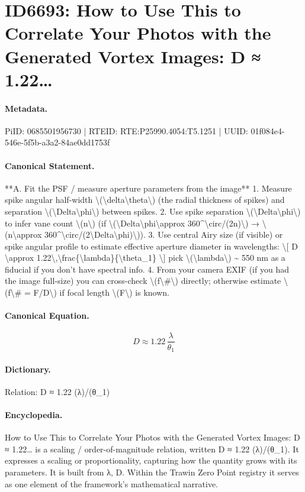 \section*{ID6693: How to Use This to Correlate Your Photos with the Generated Vortex Images: D ≈ 1.22…}
\paragraph{Metadata.}
PiID: 0685501956730 | RTEID: RTE:P25990.4054:T5.1251 | UUID: 01f084e4-546e-5f5b-a3a2-84ae0dd1753f

\paragraph{Canonical Statement.}
**A. Fit the PSF / measure aperture parameters from the image** 1. Measure spike angular half-width \textbackslash{}(\textbackslash{}delta\textbackslash{}theta\textbackslash{}) (the radial thickness of spikes) and separation \textbackslash{}(\textbackslash{}Delta\textbackslash{}phi\textbackslash{}) between spikes. 2. Use spike separation \textbackslash{}(\textbackslash{}Delta\textbackslash{}phi\textbackslash{}) to infer vane count \textbackslash{}(n\textbackslash{}) (if \textbackslash{}(\textbackslash{}Delta\textbackslash{}phi\textbackslash{}approx 360\textasciicircum{}\textbackslash{}circ/(2n)\textbackslash{}) → \textbackslash{}(n\textbackslash{}approx 360\textasciicircum{}\textbackslash{}circ/(2\textbackslash{}Delta\textbackslash{}phi)\textbackslash{})). 3. Use central Airy size (if visible) or spike angular profile to estimate effective aperture diameter in wavelengths: \textbackslash{}[ D \textbackslash{}approx 1.22\textbackslash{},\textbackslash{}frac\{\textbackslash{}lambda\}\{\textbackslash{}theta\_1\} \textbackslash{}] pick \textbackslash{}(\textbackslash{}lambda\textbackslash{}) \textasciitilde{} 550 nm as a fiducial if you don’t have spectral info. 4. From your camera EXIF (if you had the image full-size) you can cross-check \textbackslash{}(f\textbackslash{}\#\textbackslash{}) directly; otherwise estimate \textbackslash{}(f\textbackslash{}\# = F/D\textbackslash{}) if focal length \textbackslash{}(F\textbackslash{}) is known.

\paragraph{Canonical Equation.}
\[
D \approx 1.22\,\frac{\lambda}{\theta_1}
\]

\paragraph{Dictionary.}
Relation: D ≈ 1.22 (λ)/(θ\_1)

\paragraph{Encyclopedia.}
How to Use This to Correlate Your Photos with the Generated Vortex Images: D ≈ 1.22… is a scaling / order-of-magnitude relation, written D ≈ 1.22 (λ)/(θ\_1). It expresses a scaling or proportionality, capturing how the quantity grows with its parameters. It is built from λ, D. Within the Trawin Zero Point registry it serves as one element of the framework's mathematical narrative.
